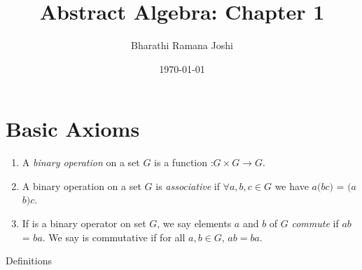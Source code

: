 \documentclass[titlepage, 12pt]{article}
\begin{document}
\title{Abstract Algebra: Chapter 1}

\author{Bharathi Ramana Joshi}

\date{\today}

\maketitle

\tableofcontents

\newpage


\section{Basic Axioms}

\begin{enumerate}

  \item A \textit{binary operation}  on a set $G$ is a function
    :$G\times G\rightarrow G$.

  \item A binary operation  on a set $G$ is \textit{associative} if
    $\forall a, b, c\in G$ we have $a$$(b$$c)$ =
    $(a$$ b)$$ c$.

  \item If  is a binary operator on set $G$, we say elements $a$
    and $b$ of $G$ \textit{commute} if $a$$b$  = $b$$a$.
    We say  is commutative if for all $a, b\in G$, $a$$b =
    b$$a$.

\end{enumerate}

Definitions
\end{document}
